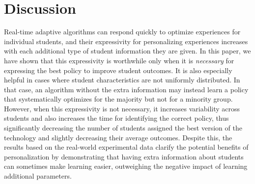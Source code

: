\section{Discussion}

Real-time adaptive algorithms can respond quickly to optimize experiences for individual students, and their expressivity for personalizing experiences increases with each additional type of student information they are given. In this paper, we have shown that this expressivity is worthwhile only when it is \textit{necessary}  for expressing the best policy to improve student outcomes. It is also especially helpful in cases where student characteristics are not uniformly distributed. In that case, an algorithm without the extra information may instead learn a policy that systematically optimizes for the majority but not for a minority group. However, when this expressivity is not necessary, it increases variability across students and also increases the time for identifying the correct policy, thus significantly decreasing the number of students assigned the best version of the technology and slightly decreasing their average outcomes. Despite this, the results based on the real-world experimental data clarify the potential benefits of personalization by demonstrating that having extra information about students can sometimes make learning easier, outweighing the negative impact of learning additional parameters.



